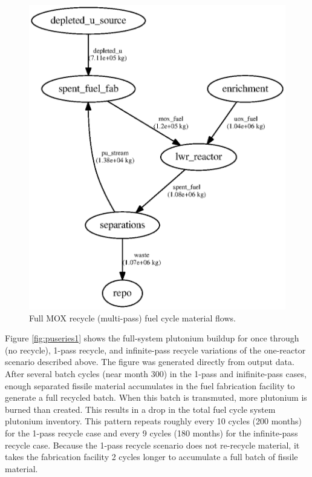\begin{figure}[H]
\begin{center}
\includegraphics{./images/flow-closed-1.eps}
\end{center}
\caption{Full \gls{MOX} recycle (multi-pass) fuel cycle material flows.}
\label{fig:flowclosed}
\end{figure}

Figure \ref{fig:puseries1} shows the full-system plutonium buildup for once
through (no recycle), 1-pass recycle, and infinite-pass recycle variations of
the one-reactor scenario described above. The figure was generated directly
from \Cyclus output data. After several batch cycles (near month 300) in the
1-pass and inifinite-pass cases, enough separated fissile material accumulates
in the fuel fabrication facility to generate a full recycled batch.  When this
batch is transmuted, more plutonium is burned than created.  This results in a
drop in the total fuel cycle system plutonium inventory.  This pattern repeats
roughly every 10 cycles (200 months) for the 1-pass recycle case and every 9
cycles (180 months) for the infinite-pass recycle case.  Because the 1-pass
recycle scenario does not re-recycle material, it takes the fabrication
facility 2 cycles longer to accumulate a full batch of fissile material.

